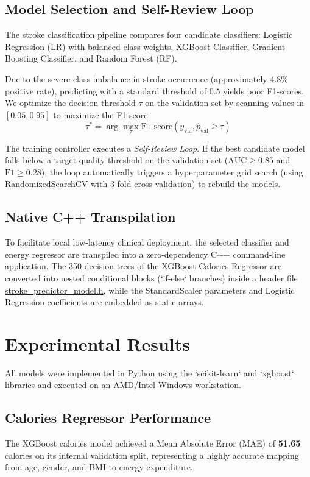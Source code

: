 \documentclass[11pt,letterpaper]{article}
\begin{document}
\subsection{Model Selection and Self-Review Loop}
The stroke classification pipeline compares four candidate classifiers: Logistic Regression (LR) with balanced class weights, XGBoost Classifier, Gradient Boosting Classifier, and Random Forest (RF). 

Due to the severe class imbalance in stroke occurrence (approximately 4.8\% positive rate), predicting with a standard threshold of $0.5$ yields poor F1-scores. We optimize the decision threshold $\tau$ on the validation set by scanning values in $[0.05, 0.95]$ to maximize the F1-score:
\begin{equation}
\tau^* = \arg\max_{\tau} \text{F1-score}(y_{\text{val}}, \hat{p}_{\text{val}} \ge \tau)
\end{equation}

The training controller executes a \textit{Self-Review Loop}. If the best candidate model falls below a target quality threshold on the validation set ($\text{AUC} \ge 0.85$ and $\text{F1} \ge 0.28$), the loop automatically triggers a hyperparameter grid search (using RandomizedSearchCV with 3-fold cross-validation) to rebuild the models.

\subsection{Native C++ Transpilation}
To facilitate local low-latency clinical deployment, the selected classifier and energy regressor are transpiled into a zero-dependency C++ command-line application. The 350 decision trees of the XGBoost Calories Regressor are converted into nested conditional blocks (`if-else` branches) inside a header file \href{file:///d:/Learning/FPT/Semester%208/DSP391p/Stroke_calo/Antigravity_code/stroke_predictor_model.h}{stroke\_predictor\_model.h}, while the StandardScaler parameters and Logistic Regression coefficients are embedded as static arrays.

\section{Experimental Results}
All models were implemented in Python using the `scikit-learn` and `xgboost` libraries and executed on an AMD/Intel Windows workstation.

\subsection{Calories Regressor Performance}
The XGBoost calories model achieved a Mean Absolute Error (MAE) of \textbf{51.65} calories on its internal validation split, representing a highly accurate mapping from age, gender, and BMI to energy expenditure.
\end{document}
